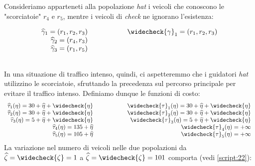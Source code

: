 Consideriamo apparteneti alla popolazione \textit{hat} i veicoli che conoscono le "scorciatoie" $r_4$ e $r_5$, mentre i veicoli di \textit{check} ne ignorano l'esistenza:

\begin{equation*}
\begin{array}{r @{\hspace{2cm}} r}

\widehat{\gamma}_1 = (r_1, r_2, r_3) &
\widecheck{\gamma}_1 = (r_1, r_2, r_3)\\

\widehat{\gamma}_2 = (r_4, r_3) & \\

\widehat{\gamma}_3 = (r_1, r_5) & \\
$$
\end{array}
\end{equation*}

In una situazione di traffico intenso, quindi, ci aspetteremmo che i guidatori \textit{hat} utilizzino le scorciatoie, sfruttando la precedenza
sul percorso principale per evitare il traffico intenso. Definiamo dunque le funzioni di costo:
\begin{equation}
\begin{array}{r @{\hspace{2cm}} r}

\widehat{\tau}_1(\eta) = 30+\widehat{\eta}+\widecheck{\eta} &
\widecheck{\tau}_1(\eta) = 30+\widehat{\eta}+\widecheck{\eta} \\

\widehat{\tau}_2(\eta) = 30+\widehat{\eta}+\widecheck{\eta} &
\widecheck{\tau}_2(\eta) = 30+\widehat{\eta}+\widecheck{\eta} \\

\widehat{\tau}_3(\eta) = 5+\widehat{\eta}+\widecheck{\eta} &
\widecheck{\tau}_3(\eta) = 5+\widehat{\eta}+\widecheck{\eta} \\

\widehat{\tau}_4(\eta) = 135+\widehat{\eta} &
\widecheck{\tau}_4(\eta) =  +\infty\\

\widehat{\tau}_5(\eta) = 105+\widehat{\eta} &
\widecheck{\tau}_5(\eta) = +\infty 
$$
\end{array}
\label{eq:13}
\end{equation}
La variazione nel numero di veicoli nelle due popolazioni da $\widehat{\zeta} = \widecheck{\zeta} = 1$ a $\widehat{\zeta} = \widecheck{\zeta} = 101$ comporta (vedi \autoref{script:22}):

